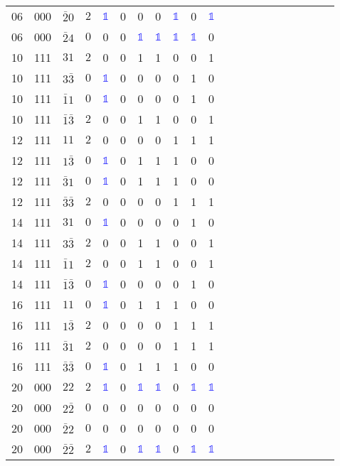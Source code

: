 \begin{longtable*}{c| cccccccccccccccccccc }
06& 000& $\bar{2}0$& $2$& \textcolor{blue}{$\mathds{1}$}& 0& 0& 0& \textcolor{blue}{$\mathds{1}$}& 0& \textcolor{blue}{$\mathds{1}$}\\
06& 000& $\bar{2}4$& $0$& 0& 0& \textcolor{blue}{$\mathds{1}$}& \textcolor{blue}{$\mathds{1}$}& \textcolor{blue}{$\mathds{1}$}& \textcolor{blue}{$\mathds{1}$}& 0\\
10& 111& $31$& $2$& 0& 0& 1& 1& 0& 0& 1\\
10& 111& $3\bar{3}$& $0$& \textcolor{blue}{$\mathds{1}$}& 0& 0& 0& 0& 1& 0\\
10& 111& $\bar{1}1$& $0$& \textcolor{blue}{$\mathds{1}$}& 0& 0& 0& 0& 1& 0\\
10& 111& $\bar{1}\bar{3}$& $2$& 0& 0& 1& 1& 0& 0& 1\\
12& 111& $11$& $2$& 0& 0& 0& 0& 1& 1& 1\\
12& 111& $1\bar{3}$& $0$& \textcolor{blue}{$\mathds{1}$}& 0& 1& 1& 1& 0& 0\\
12& 111& $\bar{3}1$& $0$& \textcolor{blue}{$\mathds{1}$}& 0& 1& 1& 1& 0& 0\\
12& 111& $\bar{3}\bar{3}$& $2$& 0& 0& 0& 0& 1& 1& 1\\
14& 111& $31$& $0$& \textcolor{blue}{$\mathds{1}$}& 0& 0& 0& 0& 1& 0\\
14& 111& $3\bar{3}$& $2$& 0& 0& 1& 1& 0& 0& 1\\
14& 111& $\bar{1}1$& $2$& 0& 0& 1& 1& 0& 0& 1\\
14& 111& $\bar{1}\bar{3}$& $0$& \textcolor{blue}{$\mathds{1}$}& 0& 0& 0& 0& 1& 0\\
16& 111& $11$& $0$& \textcolor{blue}{$\mathds{1}$}& 0& 1& 1& 1& 0& 0\\
16& 111& $1\bar{3}$& $2$& 0& 0& 0& 0& 1& 1& 1\\
16& 111& $\bar{3}1$& $2$& 0& 0& 0& 0& 1& 1& 1\\
16& 111& $\bar{3}\bar{3}$& $0$& \textcolor{blue}{$\mathds{1}$}& 0& 1& 1& 1& 0& 0\\
20& 000& $22$& $2$& \textcolor{blue}{$\mathds{1}$}& 0& \textcolor{blue}{$\mathds{1}$}& \textcolor{blue}{$\mathds{1}$}& 0& \textcolor{blue}{$\mathds{1}$}& \textcolor{blue}{$\mathds{1}$}\\
20& 000& $2\bar{2}$& $0$& 0& 0& 0& 0& 0& 0& 0\\
20& 000& $\bar{2}2$& $0$& 0& 0& 0& 0& 0& 0& 0\\
20& 000& $\bar{2}\bar{2}$& $2$& \textcolor{blue}{$\mathds{1}$}& 0& \textcolor{blue}{$\mathds{1}$}& \textcolor{blue}{$\mathds{1}$}& 0& \textcolor{blue}{$\mathds{1}$}& \textcolor{blue}{$\mathds{1}$}\\

\end{longtable*}

